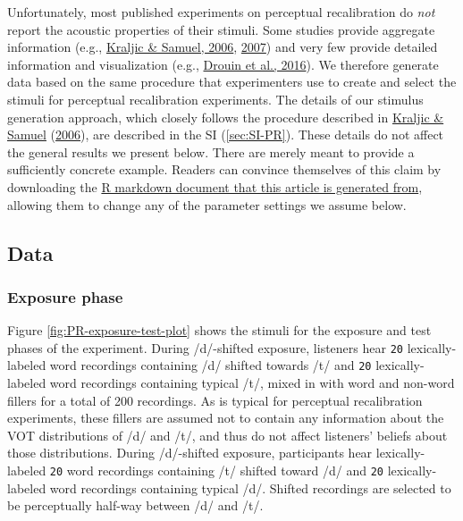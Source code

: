 \documentclass[
  11pt,
  english,
  man,floatsintext]{apa6}
\begin{document}
Unfortunately, most published experiments on perceptual recalibration do \emph{not} report the acoustic properties of their stimuli. Some studies provide aggregate information (e.g., \protect\hyperlink{ref-kraljic-samuel2006}{Kraljic \& Samuel, 2006}, \protect\hyperlink{ref-kraljic-samuel2007}{2007}) and very few provide detailed information and visualization (e.g., \protect\hyperlink{ref-drouin2016}{Drouin et al., 2016}).
We therefore generate data based on the same procedure that experimenters use to create and select the stimuli for perceptual recalibration experiments. The details of our stimulus generation approach, which closely follows the procedure described in \protect\hyperlink{ref-kraljic-samuel2006}{Kraljic \& Samuel} (\protect\hyperlink{ref-kraljic-samuel2006}{2006}), are described in the SI (\ref{sec:SI-PR}). These details do not affect the general results we present below. There are merely meant to provide a sufficiently concrete example. Readers can convince themselves of this claim by downloading the \href{https://osf.io/DO-NOT-FORGET-TO-ADD-THE-OSF-URL-HERE-XXX}{R markdown document that this article is generated from}, allowing them to change any of the parameter settings we assume below.

\hypertarget{data}{%
\subsection{Data}\label{data}}

\hypertarget{exposure-phase}{%
\subsubsection{Exposure phase}\label{exposure-phase}}

Figure \ref{fig:PR-exposure-test-plot} shows the stimuli for the exposure and test phases of the experiment. During /d/-shifted exposure, listeners hear \texttt{20} lexically-labeled word recordings containing /d/ shifted towards /t/ and \texttt{20} lexically-labeled word recordings containing typical /t/, mixed in with word and non-word fillers for a total of 200 recordings. As is typical for perceptual recalibration experiments, these fillers are assumed not to contain any information about the VOT distributions of /d/ and /t/, and thus do not affect listeners' beliefs about those distributions. During /d/-shifted exposure, participants hear lexically-labeled \texttt{20} word recordings containing /t/ shifted toward /d/ and \texttt{20} lexically-labeled word recordings containing typical /d/. Shifted recordings are selected to be perceptually half-way between /d/ and /t/.
\end{document}

